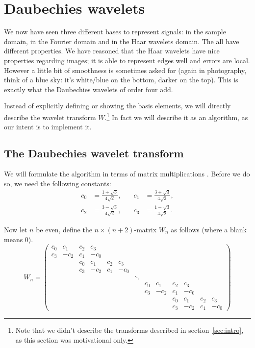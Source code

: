 
\section{Daubechies wavelets}
\label{sec:dau}
We now have seen three different bases to represent signals: in the sample domain, in the Fourier domain and in the Haar wavelets domain. The all have different properties. We have reasoned that the Haar wavelets have nice properties regarding images; it is able to represent edges well and errors are local. However a little bit of smoothness is sometimes asked for (again in photography, think of a blue sky: it's white/blue on the bottom, darker on the top). This is exactly what the Daubechies wavelets of order four add.

Instead of explicitly defining or showing the basis elements, we will directly describe the wavelet transform $W$.\footnote{Note that we didn't describe the transforms described in section~\ref{sec:intro}, as this section was motivational only.} In fact we will describe it as an algorithm, as our intent is to implement it.


\subsection{The Daubechies wavelet transform}
We will formulate the algorithm in terms of matrix multiplications \cite{numc}. Before we do so, we need the following constants:
\begin{align*}
	c_0 &= \frac{1 + \sqrt{3}}{4 \sqrt{2}}, &\quad
	c_1 &= \frac{3 + \sqrt{3}}{4 \sqrt{2}}, \\
	c_2 &= \frac{3 - \sqrt{3}}{4 \sqrt{2}}, &\quad
	c_3 &= \frac{1 - \sqrt{3}}{4 \sqrt{2}}.
\end{align*}

Now let $n$ be even, define the $n \times (n+2)$-matrix $W_n$ as follows (where a blank means $0$).
\[ W_n =
\begin{pmatrix}
	c_0 &  c_1 & c_2 &  c_3 &     &      & & & & & & & \\
	c_3 & -c_2 & c_1 & -c_0 &     &      & & & & & & & \\
	    &      & c_0 &  c_1 & c_2 &  c_3 & & & & & & & \\
	    &      & c_3 & -c_2 & c_1 & -c_0 & & & & & & & \\

	& & & & & & \ddots & & & & & & \\

	& & & & & & & c_0 &  c_1 & c_2 &  c_3 &     &      \\
	& & & & & & & c_3 & -c_2 & c_1 & -c_0 &     &      \\
	& & & & & & &     &      & c_0 &  c_1 & c_2 &  c_3 \\
	& & & & & & &     &      & c_3 & -c_2 & c_1 & -c_0
\end{pmatrix} \]

